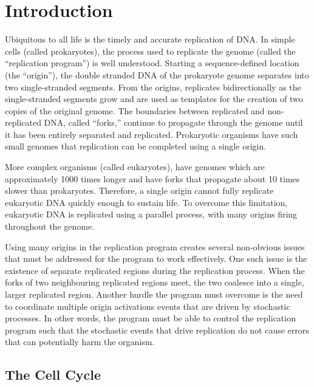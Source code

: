 \chapter{Introduction}

Ubiquitous to all life is the timely and accurate replication of DNA.
In simple cells (called prokaryotes), the process used to replicate the genome (called the ``replication program'') is well understood.
Starting a sequence-defined location (the ``origin''), the double stranded DNA of the prokaryote genome separates into two single-stranded segments.
From the origins, replicates bidirectionally as the single-stranded segments grow and are used as templates for the creation of two copies of the original genome.
The boundaries between replicated and non-replicated DNA, called ``forks,'' continue to propagate through the genome until it has been entirely separated and replicated.
Prokaryotic organisms have such small genomes that replication can be completed using a single origin. \cite{MolecularCellBiology}

More complex organisms (called eukaryotes), have genomes which are approximately 1000 times longer and have forks that propagate about 10 times slower than prokaryotes.
Therefore, a single origin cannot fully replicate eukaryotic DNA quickly enough to sustain life.
To overcome this limitation, eukaryotic DNA is replicated using a parallel process, with many origins firing throughout the genome.

Using many origins in the replication program creates several non-obvious issues that must be addressed for the program to work effectively.
One such issue is the existence of separate replicated regions during the replication process.
When the forks of two neighbouring replicated regions meet, the two coalesce into a single, larger replicated region.
Another hurdle the program must overcome is the need to coordinate multiple origin activations events that are driven by stochastic processes.
In other words, the program must be able to control the replication program such that the stochastic events that drive replication do not cause errors that can potentially harm the organism. \cite{eukaryotereview}


	\section{The Cell Cycle}
	
